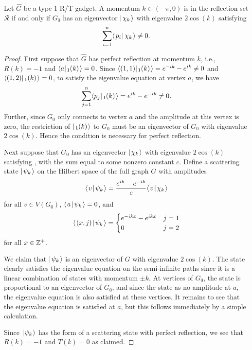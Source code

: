 \documentclass[../thesis-main/thesis-main]{subfiles}
\begin{document}
\begin{lemma}\label{lem:reflect_reqs}
Let $\hat{G}$ be a type 1 R/T gadget. A momentum $k\in (-\pi,0)$ is in the reflection set $\mathcal{R}$ if and only if $G_0$ has an eigenvector $|\mspace{2mu} \chi_k \mspace{2mu} \rangle$ with eigenvalue $2\cos(k)$ satisfying
\begin{equation}
  \sum_{i=1}^{n} \langle\mspace{2mu} p_i \mspace{2mu} | \mspace{2mu} \chi_k\mspace{2mu} \rangle \neq 0. \label{eq:sum_condition}
\end{equation}
\end{lemma}

\begin{proof}
First suppose that $\hat{G}$ has perfect reflection at momentum $k$, i.e., $R(k)=-1$ and $\langle{a}|\mspace{2mu} \sc_{1} (k) \mspace{2mu} \rangle=0$. Since $\langle{(1,1)}|\mspace{2mu} \sc_1(k) \mspace{2mu} \rangle = e^{-ik} - e^{ik}\neq 0$ and $\langle{(1,2)}|\mspace{2mu} \sc_1(k) \mspace{2mu} \rangle=0$, to satisfy the eigenvalue equation at vertex $a$, we have
\[
  \sum_{j=1}^{n} \langle{p_j}|\mspace{2mu} \sc_1(k) \mspace{2mu} \rangle = e^{ik} - e^{-ik} \neq 0.
\]
Further, since $G_0$ only connects to vertex $a$ and the amplitude at this vertex is zero, the restriction of $|\mspace{2mu} \sc_1(k) \mspace{2mu} \rangle$ to $G_0$ must be an eigenvector of $G_0$ with eigenvalue $2\cos(k)$. Hence the condition is necessary for perfect reflection. 
 
Next suppose that $G_0$ has an eigenvector $|\mspace{2mu} \chi_k \mspace{2mu} \rangle$ with eigenvalue $2\cos(k)$ satisfying , with the sum equal to some nonzero constant $c$. Define a scattering state $|\mspace{2mu} \psi_k \mspace{2mu} \rangle$ on the Hilbert space of the full graph $G$ with amplitudes
\[
  \langle\mspace{2mu} v \mspace{2mu} | \mspace{2mu} \psi_k\mspace{2mu} \rangle = \frac{e^{ik} - e^{-ik}}{c} \langle\mspace{2mu} v \mspace{2mu} | \mspace{2mu} \chi_k\mspace{2mu} \rangle
\]
for all $v \in V(G_0)$, $\langle\mspace{2mu} a \mspace{2mu} | \mspace{2mu} \psi_k\mspace{2mu} \rangle=0$, and 
\[
 \langle\mspace{2mu} (x,j) \mspace{2mu} | \mspace{2mu} \psi_k\mspace{2mu} \rangle=\begin{cases} e^{-ikx}-e^{ikx} & j=1\\
0 & j=2
\end{cases}
\]
for all $x \in \mathbb{Z}^+$.

We claim that $|\mspace{2mu} \psi_k \mspace{2mu} \rangle$ is an eigenvector of $G$ with eigenvalue $2 \cos(k)$.  The state clearly satisfies the eigenvalue equation on the semi-infinite paths since it is a linear combination of states with momentum $\pm k$.  At vertices of $G_0$, the state is proportional to an eigenvector of $G_0$, and since the state as no amplitude at $a$, the eigenvalue equation is also satisfied at these vertices.  It remains to see that the eigenvalue equation is satisfied at $a$, but this follows immediately by a simple calculation.

Since $|\mspace{2mu} \psi_k \mspace{2mu} \rangle$ has the form of a scattering state with perfect reflection, we see that $R(k)=-1$ and $T(k)=0$ as claimed.
\end{proof}
\end{document}
